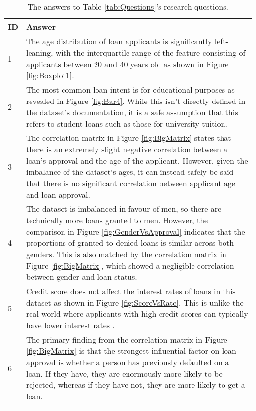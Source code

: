 \begin{longtable}{ | p{} | p{} | }
    \hline
    \cellcolor{blue!25} ID & \cellcolor{blue!25} Answer \\
    \hline
    1 & The age distribution of loan applicants is significantly left-leaning, with the interquartile range 
    of the feature consisting of applicants between 20 and 40 years old as shown in Figure \ref{fig:Boxplot1}. \\
    \hline
    2 & The most common loan intent is for educational purposes as revealed in Figure \ref{fig:Bar4}. While this isn't directly defined in the dataset's 
    documentation, it is a safe assumption that this refers to student loans such as those for university tuition. \\
    \hline
    3 & The correlation matrix in Figure \ref{fig:BigMatrix} states that there is an extremely slight negative correlation 
    between a loan's approval and the age of the applicant. However, given the imbalance of the dataset's ages, it can instead 
    safely be said that there is no significant correlation between applicant age and loan approval. \\
    \hline 
    4 & The dataset is imbalanced in favour of men, so there are technically more loans granted to men. However, 
    the comparison in Figure \ref{fig:GenderVsApproval} indicates that the proportions of granted to denied loans 
    is similar across both genders. This is also matched by the correlation matrix in Figure \ref{fig:BigMatrix}, 
    which showed a negligible correlation between gender and loan status. \\
    \hline 
    5 & Credit score does not affect the interest rates of loans in this dataset as shown in Figure \ref{fig:ScoreVsRate}. 
    This is unlike the real world where applicants with high credit scores can typically have lower interest rates \autocite{american_express_does_nodate}. 
    \\
    \hline 
    6 & The primary finding from the correlation matrix in Figure \ref{fig:BigMatrix} is that the strongest influential factor on 
    loan approval is whether a person has previously defaulted on a loan. If they have, they are enormously more likely to
    be rejected, whereas if they have not, they are more likely to get a loan. \\
    \hline
    \caption{The answers to Table \ref{tab:Questions}'s research questions.}\label{tab:Answers}
\end{longtable}

